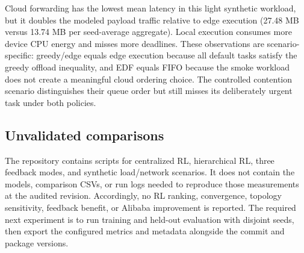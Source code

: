 \begin{table}[t]
\centering
\caption{Three-seed synthetic baseline evidence (mean $\pm$ standard deviation).}
\label{tab:baselines}
\scriptsize
{}
\end{table}

Cloud forwarding has the lowest mean latency in this light synthetic
workload, but it doubles the modeled payload traffic relative to edge
execution (27.48 MB versus 13.74 MB per seed-average aggregate). Local
execution consumes more device CPU energy and misses more deadlines. These
observations are scenario-specific: greedy/edge equals edge execution because
all default tasks satisfy the greedy offload inequality, and EDF equals FIFO
because the smoke workload does not create a meaningful cloud ordering choice.
The controlled contention scenario distinguishes their queue order but still
misses its deliberately urgent task under both policies.

\subsection{Unvalidated comparisons}
The repository contains scripts for centralized RL, hierarchical RL, three
feedback modes, and synthetic load/network scenarios. It does not contain the
models, comparison CSVs, or run logs needed to reproduce those measurements at
the audited revision. Accordingly, no RL ranking, convergence, topology
sensitivity, feedback benefit, or Alibaba improvement is reported. The
required next experiment is to run training and held-out evaluation with
disjoint seeds, then export the configured metrics and metadata alongside the
commit and package versions.

